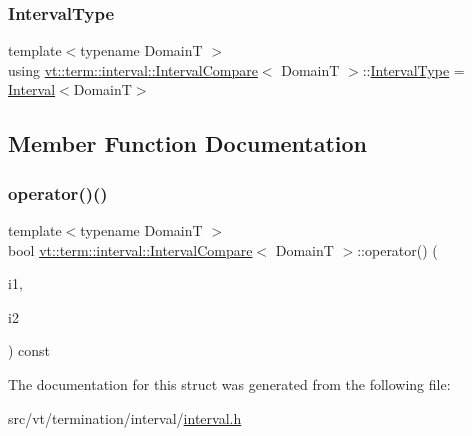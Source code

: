 \subsubsection{\texorpdfstring{Interval\+Type}{IntervalType}}
{\footnotesize\ttfamily template$<$typename DomainT $>$ \\
using \hyperlink{structvt_1_1term_1_1interval_1_1_interval_compare}{vt\+::term\+::interval\+::\+Interval\+Compare}$<$ DomainT $>$\+::\hyperlink{structvt_1_1term_1_1interval_1_1_interval_compare_a0f8be38c302892b92b68484f1925ac71}{Interval\+Type} =  \hyperlink{structvt_1_1term_1_1interval_1_1_interval}{Interval}$<$DomainT$>$}



\subsection{Member Function Documentation}
\mbox{\label{structvt_1_1term_1_1interval_1_1_interval_compare_ae30957e5c338baf722853e9a0ef04fa2}} 
\subsubsection{\texorpdfstring{operator()()}{operator()()}}
{\footnotesize\ttfamily template$<$typename DomainT $>$ \\
bool \hyperlink{structvt_1_1term_1_1interval_1_1_interval_compare}{vt\+::term\+::interval\+::\+Interval\+Compare}$<$ DomainT $>$\+::operator() (\begin{DoxyParamCaption}\item[{\hyperlink{structvt_1_1term_1_1interval_1_1_interval_compare_a0f8be38c302892b92b68484f1925ac71}{Interval\+Type} const \&}]{i1,  }\item[{\hyperlink{structvt_1_1term_1_1interval_1_1_interval_compare_a0f8be38c302892b92b68484f1925ac71}{Interval\+Type} const \&}]{i2 }\end{DoxyParamCaption}) const\hspace{0.3cm}{\ttfamily [inline]}}



The documentation for this struct was generated from the following file\+:\begin{DoxyCompactItemize}
\item 
src/vt/termination/interval/\hyperlink{interval_8h}{interval.\+h}\end{DoxyCompactItemize}
